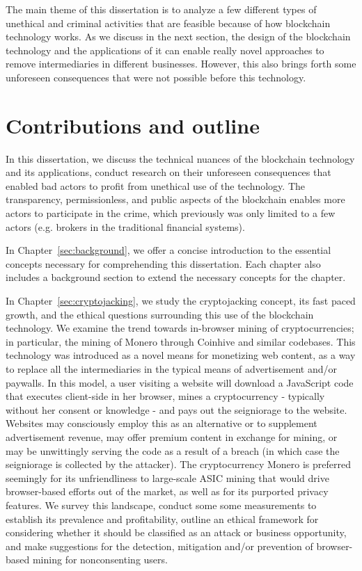 The main theme of this dissertation is to analyze a few different types of unethical and criminal activities that are feasible because of how blockchain technology works. As we discuss in the next section, the design of the blockchain technology and the applications of it can enable really novel approaches to remove intermediaries in different businesses. However, this also brings forth some unforeseen consequences that were not possible before this technology.


\section{Contributions and outline} %
In this dissertation, we discuss the technical nuances of the blockchain technology and its applications, conduct research on their unforeseen consequences that enabled bad actors to profit from unethical use of the technology. The transparency, permissionless, and public aspects of the blockchain enables more actors to participate in the crime, which previously was only limited to a few actors (e.g. brokers in the traditional financial systems). 

In Chapter~\ref{sec:background}, we offer a concise introduction to the essential concepts necessary for comprehending this dissertation. Each chapter also includes a background section to extend the necessary concepts for the chapter.

In Chapter~\ref{sec:cryptojacking}, we study the cryptojacking concept, its fast paced growth, and the ethical questions surrounding this use of the blockchain technology. We examine the trend towards in-browser mining of cryptocurrencies; in particular, the mining of Monero through Coinhive and similar codebases. This technology was introduced as a novel means for monetizing web content, as a way to replace all the intermediaries in the typical means of advertisement and/or paywalls. In this model, a user visiting a website will download a JavaScript code that executes client-side in her browser, mines a cryptocurrency - typically without her consent or knowledge - and pays out the seigniorage to the website. Websites may consciously employ this as an alternative or to supplement advertisement revenue, may offer premium content in exchange for mining, or may be unwittingly serving the code as a result of a breach (in which case the seigniorage is collected by the attacker). The cryptocurrency Monero is preferred seemingly for its unfriendliness to large-scale ASIC mining that would drive browser-based efforts out of the market, as well as for its purported privacy features. We survey this landscape, conduct some some measurements to establish its prevalence and profitability, outline an ethical framework for considering whether it should be classified as an attack or business opportunity, and make suggestions for the detection, mitigation and/or prevention of browser-based mining for nonconsenting users.


